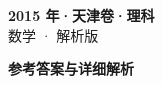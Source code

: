 \documentclass[zihao=-4, a4paper]{ctexart}
\begin{document}
\begin{center}
  {\Large\bfseries 2015 年·天津卷·理科}\\[4pt]
  {\large 数学 · 解析版}
\end{center}
\medskip
{}

\clearpage
{}
\begin{center}{\Large\bfseries 参考答案与详细解析}\end{center}
\medskip

\end{document}
